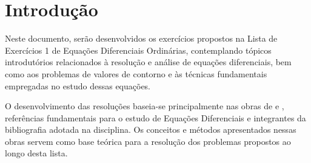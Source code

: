 \section{Introdução}

Neste documento, serão desenvolvidos os exercícios propostos na Lista de
Exercícios 1 de Equações Diferenciais Ordinárias, contemplando tópicos
introdutórios relacionados à resolução e análise de equações diferenciais, bem
como aos problemas de valores de contorno e às técnicas fundamentais empregadas
no estudo dessas equações.

O desenvolvimento das resoluções baseia-se principalmente nas obras de
\citeauthor{zill2001equacoes} \cite{zill2001equacoes} e
\citeauthor{boyce2015equacoes} \cite{boyce2015equacoes}, referências
fundamentais para o estudo de Equações Diferenciais e integrantes da
bibliografia adotada na disciplina. Os conceitos e métodos apresentados nessas
obras servem como base teórica para a resolução dos problemas propostos ao
longo desta lista.
